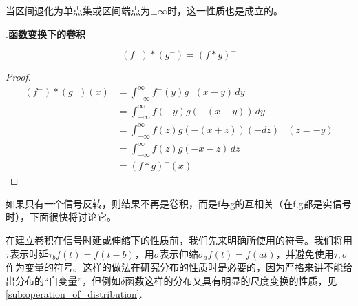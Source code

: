 \documentclass{ctexbook}
\begin{document}
当区间退化为单点集或区间端点为$\pm\infty$时，这一性质也是成立的。

.\textbf{函数变换下的卷积}
\begin{proposition}[信号反转下的卷积]
    \[(f^-)*(g^-)=(f*g)^-\]
\end{proposition}
\begin{proof}
    \begin{align*}
    (f^-)*(g^-)(x) & =\int_{-\infty}^{\infty}f^-(y)g^-(x-y)\,dy          \\
                   & =\int_{-\infty}^{\infty}f(-y)g(-(x-y))\,dy          \\
                   & =\int_{-\infty}^{\infty}f(z)g(-(x+z))(-dz) & (z=-y) \\
                   & =\int_{-\infty}^{\infty}f(z)g(-x-z)\,dz             \\
                   & =(f*g)^-(x)
\end{align*}
\end{proof}

如果只有一个信号反转，则结果不再是卷积，而是f与g的互相关（在f,g都是实信号时），下面很快将讨论它。

在建立卷积在信号时延或伸缩下的性质前，我们先来明确所使用的符号。我们将用$\tau$表示时延$\tau_b f(t)=f(t-b)$，用$\sigma$表示伸缩$\sigma_a f(t)=f(at)$，并避免使用$\tau,\sigma$作为变量的符号。这样的做法在研究分布的性质时是必要的，因为严格来讲不能给出分布的“自变量”，但例如$\delta$函数这样的分布又具有明显的尺度变换的性质，见\ref{sub:operation_of_distribution}.
\end{document}
